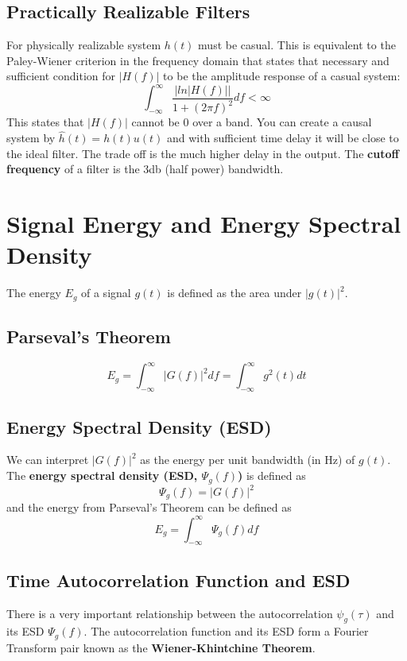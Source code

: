 \documentclass{article}
\begin{document}
    \subsection{Practically Realizable Filters}
    For physically realizable system $h(t)$ must be casual. This is equivalent to the Paley-Wiener criterion in the frequency domain that states that
    necessary and sufficient condition for $|H(f)|$ to be the amplitude response of a casual system:
    \begin{equation}
        \int_{-\infty}^{\infty}\frac{|ln|H(f)||}{1+(2\pi f)^2}df < \infty
    \end{equation}
    This states that $|H(f)|$ cannot be $0$ over a band. You can create a causal system by $\hat{h}(t) = h(t)u(t)$ and with sufficient time delay it
    will be close to the ideal filter. The trade off is the much higher delay in the output. The \textbf{cutoff frequency} of a filter is the 3db (half power)
    bandwidth.

    \section{Signal Energy and Energy Spectral Density}
    The energy $E_g$ of a signal $g(t)$ is defined as the area under $|g(t)|^2$.
    \subsection{Parseval's Theorem}
    \begin{equation}
        E_g = \int_{-\infty}^{\infty}|G(f)|^2df = \int_{-\infty}^{\infty}g^2(t)dt
    \end{equation}

    \subsection{Energy Spectral Density (ESD)}
    We can interpret $|G(f)|^2$ as the energy per unit bandwidth (in Hz) of $g(t)$. The \textbf{energy spectral density (ESD, $ \varPsi_g(f)$)} is defined
    as 
    \begin{equation}
        \varPsi_g(f) = |G(f)|^2
    \end{equation}
    and the energy from Parseval's Theorem can be defined as
    \begin{equation}
        E_g = \int_{-\infty}^{\infty}\varPsi_g(f)df
    \end{equation}

    \subsection{Time Autocorrelation Function and ESD}
    There is a very important relationship between the autocorrelation $\psi_g(\tau)$ 
    and its ESD $\varPsi_g(f)$. The autocorrelation function and its ESD form a Fourier Transform pair known as the \textbf{Wiener-Khintchine Theorem}.
\end{document}
